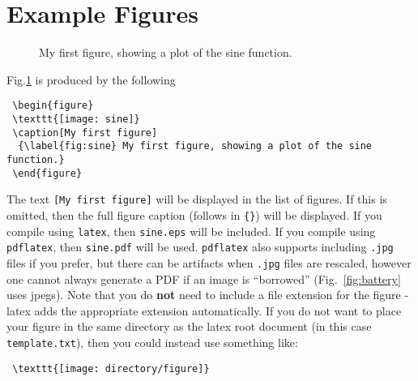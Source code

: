 \section{Example Figures} %
 \begin{figure}
 \centering


 \caption[My first figure]%
  {\label{fig:sine} My first figure, showing a plot of the sine function.}
 \vspace{0.5 in}
 \end{figure}

Fig.\ref{fig:sine} is produced by the following
\begin{verbatim}
 \begin{figure}
 \texttt{[image: sine]}
 \caption[My first figure] 
  {\label{fig:sine} My first figure, showing a plot of the sine function.}
 \end{figure}
\end{verbatim}
The text \verb#[My first figure]# will be displayed in the list of figures.
If this is omitted, then the full figure caption (follows in \verb#{}#) 
will be displayed.  If you compile using \verb#latex#, then \verb#sine.eps# will be included.
If you compile using \verb#pdflatex#, then \verb#sine.pdf# will be used.  \verb#pdflatex#
also supports including \verb#.jpg# files if you prefer, but there can be artifacts when 
\verb#.jpg# files are rescaled, however one cannot always generate a PDF if an
image is ``borrowed'' (Fig.~\ref{fig:battery} uses jpegs).  
Note that you do \textbf{not} need to include a file extension 
for the figure - latex adds the appropriate extension automatically.  If you do
not want to place your figure in the same directory as the latex root document 
(in this case \verb#template.txt#), then you could instead use something like:
\begin{verbatim}
 \texttt{[image: directory/figure]}
\end{verbatim}



